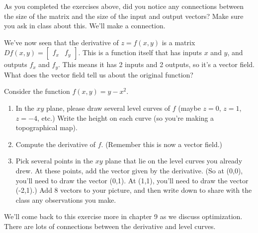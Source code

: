 As you completed the exercises above, did you notice any connections between the size of the matrix and the size of the input and output vectors?  Make sure you ask in class about this.  We'll make a connection.

We've now seen that the derivative of $z=f(x,y)$ is a matrix $Df(x,y) = \begin{bmatrix}f_x & f_y\end{bmatrix}$. This is a function itself that has inputs $x$ and $y$, and outputs $f_x$ and $f_y$. This means it has 2 inputs and 2 outputs, so it's a vector field. What does the vector field tell us about the original function?
\begin{challenge}
 Consider the function $f(x,y)=y-x^2$. 
\begin{enumerate}
 \item In the $xy$ plane, please draw several level curves of $f$ (maybe $z=0$, $z=1$, $z=-4$, etc.)  Write the height on each curve (so you're making a topographical map).
 \item Compute the derivative of $f$. (Remember this is now a vector field.)
 \item Pick several points in the $xy$ plane that lie on the level curves you already drew.  At these points, add the vector given by the derivative.  (So at (0,0), you'll need to draw the vector (0,1).  At (1,1), you'll need to draw the vector (-2,1).) Add 8 vectors to your picture, and then write down to share with the class any observations you make.
\end{enumerate}
\end{challenge}
We'll come back to this exercise more in chapter 9 as we discuss optimization.  There are lots of connections between the derivative and level curves. 


